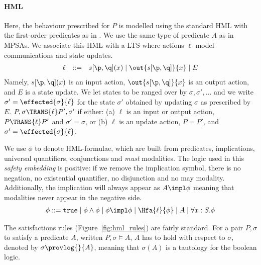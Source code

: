 \paragraph{HML} 

Here, the behaviour prescribed for $P$ is modelled using the standard
HML with the first-order predicates as in
\cite{DBLP:conf/icalp/BergerHY08}. We use the same type of predicate
$A$ as in MPSAs. We associate this HML with a LTS where actions $\ell$
model communications and state updates.
$$
\begin{array}{rll}
\ell & ::= & s[\p,\q](x) \mid \out{s[\p,\q]}{x} \mid E
\end{array}
$$
Namely, $s[\p,\q](x)$ is an input action, $\out{s[\p,\q]}{x}$ is an output action, and $E$ is a state update. We let states to be ranged over by $\sigma,\sigma',\ldots$ and we write $\sigma' = \effected{\sigma}{\ell}$ for the state $\sigma'$ obtained by updating $\sigma$ as prescribed by $E$. 
$P,\sigma \TRANS{\ell}P',\sigma'$ if either:  (a) $\ell$ is an input or output action, $P \TRANS{\ell} P'$ and $\sigma' = \sigma$, or (b) $\ell$ is an update action, $P = P'$, and $\sigma' = \effected{\sigma}{\ell}$. 

We use $\phi$ to denote HML-formulae, which are built from predicates, implications, universal
quantifiers, conjunctions and \emph{must} modalities. The logic used
in this \emph{safety embedding} is positive: if we remove the
implication symbol, there is no negation, no existential quantifier,
no disjunction and no may modality. Additionally, the implication will
always appear as $A \impl \phi$ meaning that modalities never appear
in the negative side.
$$
\begin{array}{rll}
 \phi  ::=  \mathtt{true} \mid \phi \land \phi \mid \phi \impl \phi \mid
 \Hfa{\ell}{\phi} \mid A \mid \forall x:S.\phi  
\end{array}
$$

















The satisfactions rules (Figure~\ref{fig:hml_rules}) are fairly
standard. For a pair $P,\sigma$ to satisfy a predicate $A$, written $P,\sigma\models A$, $A$ has to
hold with respect to $\sigma$, denoted by $\sigma \provlog{}{A}$, meaning
that $\sigma(A)$ is a tautology for the boolean logic.


